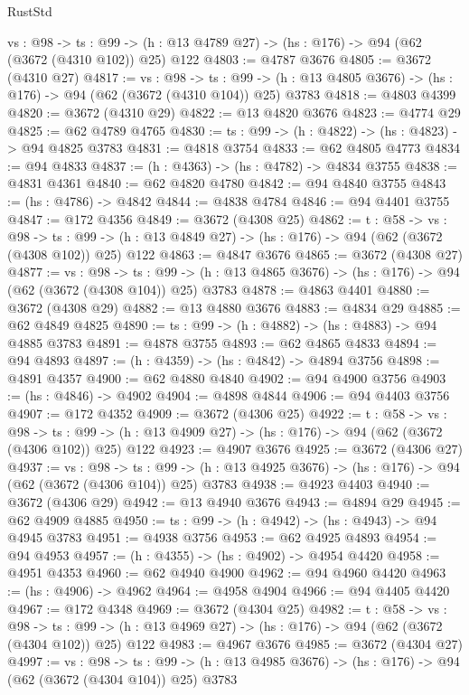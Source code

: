 \begin{lexlean}{RustStd}
\begin{coremodule}
  {vs : @98} ->
  {ts : @99} -> (h : @13 @4789 @27) -> (hs : @176) -> @94 (@62 (@3672 (@4310 @102)) @25) @122
@4803 := @4787 @3676
@4805 := @3672 (@4310 @27)
@4817 := {vs : @98} ->
  {ts : @99} -> (h : @13 @4805 @3676) -> (hs : @176) -> @94 (@62 (@3672 (@4310 @104)) @25) @3783
@4818 := @4803 @4399
@4820 := @3672 (@4310 @29)
@4822 := @13 @4820 @3676
@4823 := @4774 @29
@4825 := @62 @4789 @4765
@4830 := {ts : @99} -> (h : @4822) -> (hs : @4823) -> @94 @4825 @3783
@4831 := @4818 @3754
@4833 := @62 @4805 @4773
@4834 := @94 @4833
@4837 := (h : @4363) -> (hs : @4782) -> @4834 @3755
@4838 := @4831 @4361
@4840 := @62 @4820 @4780
@4842 := @94 @4840 @3755
@4843 := (hs : @4786) -> @4842
@4844 := @4838 @4784
@4846 := @94 @4401 @3755
@4847 := @172 @4356
@4849 := @3672 (@4308 @25)
@4862 := {t : @58} ->
  {vs : @98} ->
  {ts : @99} -> (h : @13 @4849 @27) -> (hs : @176) -> @94 (@62 (@3672 (@4308 @102)) @25) @122
@4863 := @4847 @3676
@4865 := @3672 (@4308 @27)
@4877 := {vs : @98} ->
  {ts : @99} -> (h : @13 @4865 @3676) -> (hs : @176) -> @94 (@62 (@3672 (@4308 @104)) @25) @3783
@4878 := @4863 @4401
@4880 := @3672 (@4308 @29)
@4882 := @13 @4880 @3676
@4883 := @4834 @29
@4885 := @62 @4849 @4825
@4890 := {ts : @99} -> (h : @4882) -> (hs : @4883) -> @94 @4885 @3783
@4891 := @4878 @3755
@4893 := @62 @4865 @4833
@4894 := @94 @4893
@4897 := (h : @4359) -> (hs : @4842) -> @4894 @3756
@4898 := @4891 @4357
@4900 := @62 @4880 @4840
@4902 := @94 @4900 @3756
@4903 := (hs : @4846) -> @4902
@4904 := @4898 @4844
@4906 := @94 @4403 @3756
@4907 := @172 @4352
@4909 := @3672 (@4306 @25)
@4922 := {t : @58} ->
  {vs : @98} ->
  {ts : @99} -> (h : @13 @4909 @27) -> (hs : @176) -> @94 (@62 (@3672 (@4306 @102)) @25) @122
@4923 := @4907 @3676
@4925 := @3672 (@4306 @27)
@4937 := {vs : @98} ->
  {ts : @99} -> (h : @13 @4925 @3676) -> (hs : @176) -> @94 (@62 (@3672 (@4306 @104)) @25) @3783
@4938 := @4923 @4403
@4940 := @3672 (@4306 @29)
@4942 := @13 @4940 @3676
@4943 := @4894 @29
@4945 := @62 @4909 @4885
@4950 := {ts : @99} -> (h : @4942) -> (hs : @4943) -> @94 @4945 @3783
@4951 := @4938 @3756
@4953 := @62 @4925 @4893
@4954 := @94 @4953
@4957 := (h : @4355) -> (hs : @4902) -> @4954 @4420
@4958 := @4951 @4353
@4960 := @62 @4940 @4900
@4962 := @94 @4960 @4420
@4963 := (hs : @4906) -> @4962
@4964 := @4958 @4904
@4966 := @94 @4405 @4420
@4967 := @172 @4348
@4969 := @3672 (@4304 @25)
@4982 := {t : @58} ->
  {vs : @98} ->
  {ts : @99} -> (h : @13 @4969 @27) -> (hs : @176) -> @94 (@62 (@3672 (@4304 @102)) @25) @122
@4983 := @4967 @3676
@4985 := @3672 (@4304 @27)
@4997 := {vs : @98} ->
  {ts : @99} -> (h : @13 @4985 @3676) -> (hs : @176) -> @94 (@62 (@3672 (@4304 @104)) @25) @3783

\end{coremodule}
\end{lexlean}
